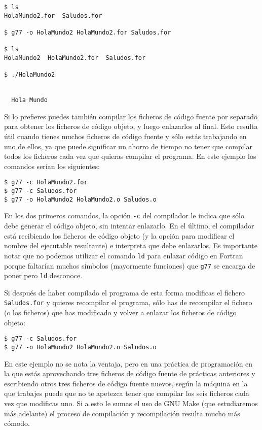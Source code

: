 \begin{verbatim}
$ ls
HolaMundo2.for  Saludos.for

$ g77 -o HolaMundo2 HolaMundo2.for Saludos.for

$ ls
HolaMundo2  HolaMundo2.for  Saludos.for

$ ./HolaMundo2


  Hola Mundo

\end{verbatim}

Si lo prefieres puedes también  compilar los ficheros de código fuente
por  separado para  obtener los  ficheros  de código  objeto, y  luego
enlazarlos al final.  Esto resulta útil cuando  tienes muchos ficheros
de código fuente y sólo estás trabajando en uno de ellos, ya que puede
significar  un  ahorro de  tiempo  no  tener  que compilar  todos  los
ficheros cada  vez que quieras  compilar el programa. En  este ejemplo
los comandos serían los siguientes:

\begin{verbatim}
$ g77 -c HolaMundo2.for 
$ g77 -c Saludos.for 
$ g77 -o HolaMundo2 HolaMundo2.o Saludos.o
\end{verbatim}

En  los dos  primeros  comandos,  la opción  {\tt  -c} del  compilador
le  indica  que sólo  debe  generar  el  código objeto,  sin  intentar
enlazarlo. En el último, el compilador está recibiendo los ficheros de
código objeto  (y la  opción para modificar  el nombre  del ejecutable
resultante) e interpreta que debe  enlazarlos. Es importante notar que
no podemos utilizar el comando {\tt ld} para enlazar código en Fortran
porque faltarían muchos símbolos  (mayormente funciones) que {\tt g77}
se encarga de poner pero {\tt ld} desconoce.

Si después de  haber compilado el programa de esta  forma modificas el
fichero {\tt Saludos.for}  y quieres recompilar el  programa, sólo has
de recompilar el fichero (o los  ficheros) que has modificado y volver
a enlazar los ficheros de código objeto: 

\begin{verbatim}
$ g77 -c Saludos.for 
$ g77 -o HolaMundo2 HolaMundo2.o Saludos.o
\end{verbatim}

En  este ejemplo  no  se nota  la  ventaja, pero  en  una práctica  de
programación  en la  que estás  aprovechando tres  ficheros de  código
fuente de  prácticas anteriores y  escribiendo otros tres  ficheros de
código fuente nuevos, según la máquina en la que trabajes puede que no
te  apetezca  tener  que  compilar  los seis  ficheros  cada  vez  que
modificas uno. Si a esto le sumas el uso de GNU Make (que estudiaremos
más adelante) el proceso de  compilación y recompilación resulta mucho
más cómodo.

